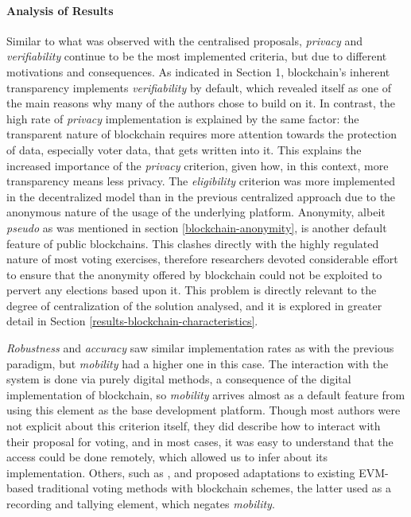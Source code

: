 \documentclass[../access.tex]{subfiles}
\begin{document}
\paragraph{Analysis of Results}
\label{analysis_results_table3}
Similar to what was observed with the centralised proposals, \textit{privacy} and \textit{verifiability} continue to be the most implemented criteria, but due to different motivations and consequences. As indicated in Section 1, blockchain's inherent transparency implements \textit{verifiability} by default, which revealed itself as one of the main reasons why many of the authors chose to build on it. In contrast, the high rate of \textit{privacy} implementation is explained by the same factor: the transparent nature of blockchain requires more attention towards the protection of data, especially voter data, that gets written into it. This explains the increased importance of the \textit{privacy} criterion, given how, in this context, more transparency means less privacy. The \textit{eligibility} criterion was more implemented in the decentralized model than in the previous centralized approach due to the anonymous nature of the usage of the underlying platform. Anonymity, albeit \textit{pseudo} as was mentioned in section \ref{blockchain-anonymity}, is another default feature of public blockchains. This clashes directly with the highly regulated nature of most voting exercises, therefore researchers devoted considerable effort to ensure that the anonymity offered by blockchain could not be exploited to pervert any elections based upon it. This problem is directly relevant to the degree of centralization of the solution analysed, and it is explored in greater detail in Section \ref{results-blockchain-characteristics}.
\par
\textit{Robustness} and \textit{accuracy} saw similar implementation rates as with the previous paradigm, but \textit{mobility} had a higher one in this case. The interaction with the system is done via purely digital methods, a consequence of the digital implementation of blockchain, so \textit{mobility} arrives almost as a default feature from using this element as the base development platform. Though most authors were not explicit about this criterion itself, they did describe how to interact with their proposal for voting, and in most cases, it was easy to understand that the access could be done remotely, which allowed us to infer about its implementation. Others, such as \cite{Seftyanto2019}, \cite{Alvi2022} and \cite{Bosri2019} proposed adaptations to existing EVM-based traditional voting methods with blockchain schemes, the latter used as a recording and tallying element, which negates \textit{mobility}.
\end{document}
